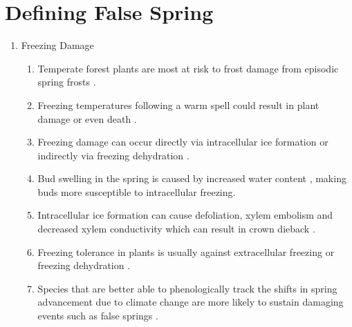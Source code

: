 \documentclass{article}\usepackage[]{graphicx}\usepackage[]{color}
\begin{document}


\section*{Defining False Spring}
\begin{enumerate}
\item Freezing Damage
\begin{enumerate}
\item Temperate forest plants are most at risk to frost damage from episodic spring frosts \citep{Sakai1987}. 
\item Freezing temperatures following a warm spell could result in plant damage or even death \citep{Ludlum1968, Mock2007}.
\item Freezing damage can occur directly via intracellular ice formation or indirectly via freezing dehydration \citep{Pearce2001, Beck2004, Hofmann2015}.
\item Bud swelling in the spring is caused by increased water content \citep{Essiamah1986}, making buds more susceptible to intracellular freezing. 
\item Intracellular ice formation can cause defoliation, xylem embolism and decreased xylem conductivity which can result in crown dieback \citep{Gu2008}.
\item Freezing tolerance in plants is usually against extracellular freezing or freezing dehydration \citep{Burke1976}.
\item Species that are better able to phenologically track the shifts in spring advancement due to climate change are more likely to sustain damaging events such as false springs \citep{Scheifinger2003}.
\end {enumerate}



\end{enumerate}
\end{document}
